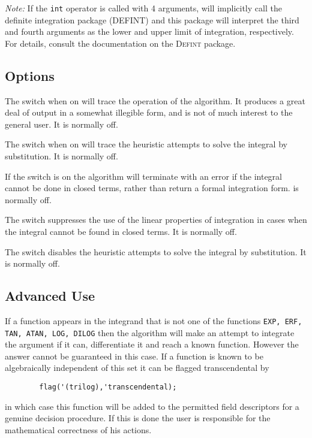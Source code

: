\textit{Note:} If the \texttt{int} operator is called with 4 arguments,
{\REDUCE} will implicitly call the definite integration package (DEFINT)
and this package will interpret the third and fourth arguments as the lower
and upper limit of integration, respectively.  For details, consult
the documentation on the \textsc{Defint} package.


\subsection{Options}
\hypertarget{switch:TRINT}{}
\hypertarget{switch:TRINTSUBST}{}
\hypertarget{switch:FAILHARD}{}
\hypertarget{switch:NOLNR}{}
\hypertarget{switch:NOINTSUBST}{}

The switch  when on will trace the operation of the algorithm. It
produces a great deal of output in a somewhat illegible form, and is not
of much interest to the general user. It is normally off.

The switch  when on will trace the heuristic attempts to
solve the integral by substitution. It is normally off.

If the switch  is on the algorithm will terminate with an
error if the integral cannot be done in closed terms, rather than return a
formal integration form.  is normally off.

The switch  suppresses the use of the linear properties of
integration in cases when the integral cannot be found in closed terms.
It is normally off.

The switch  disables the heuristic attempts to solve
the integral by substitution. It is normally off.

\subsection{Advanced Use}
\hypertarget{operator:ERF}{}

If a function appears in the integrand that is not one of the functions
\texttt{EXP, ERF, TAN, ATAN, LOG, DILOG}
then the algorithm will make an
attempt to integrate the argument if it can, differentiate it and reach a
known function.  However the answer cannot be guaranteed in this case.  If
a function is known to be algebraically independent of this set it can be
flagged transcendental by
\begin{verbatim}
        flag('(trilog),'transcendental);
\end{verbatim}
in which case this function will be added to the permitted field
descriptors for a genuine decision procedure. If this is done the user is
responsible for the mathematical correctness of his actions.

